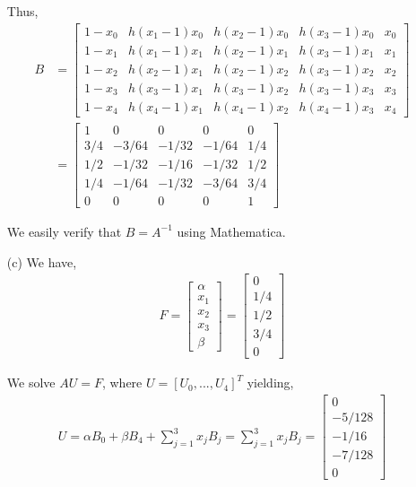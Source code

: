 \documentclass[10pt]{article}
\begin{document}
\begin{solution}[Solution]
\begin{enumerate}
        Thus,
        \begin{align*}
            B &= 
            \left[\begin{array}{rrrrr}
                1-x_0 & h(x_1-1)x_0 & h(x_2-1)x_0 & h(x_3-1)x_0 & x_0 \\
                1-x_1 & h(x_1-1)x_1 & h(x_2-1)x_1 & h(x_3-1)x_1 & x_1 \\
                1-x_2 & h(x_2-1)x_1 & h(x_2-1)x_2 & h(x_3-1)x_2 & x_2 \\
                1-x_3 & h(x_3-1)x_1 & h(x_3-1)x_2 & h(x_3-1)x_3 & x_3 \\
                1-x_4 & h(x_4-1)x_1 & h(x_4-1)x_2 & h(x_4-1)x_3 & x_4
            \end{array}\right]
            \\ &= 
            \left[\begin{array}{rrrrr}
                1   & 0 & 0 & 0 & 0 \\
                3/4 & -3/64 & -1/32 & -1/64 & 1/4 \\
                1/2 & -1/32 & -1/16 & -1/32 & 1/2 \\
                1/4 & -1/64 & -1/32 & -3/64 & 3/4 \\
                0   & 0 & 0 & 0 & 1
            \end{array}\right]
        \end{align*}

        We easily verify that \( B=A^{-1} \) using Mathematica.

    \item[(c)]
        We have,
        \begin{align*}
            F = \left[\begin{array}{r}
                \alpha \\ x_1 \\ x_2 \\ x_3 \\ \beta
            \end{array}\right]
            = \left[\begin{array}{r}
                0 \\ 1/4 \\ 1/2 \\ 3/4 \\ 0 
            \end{array}\right]
        \end{align*}

        We solve \( AU = F \), where \( U = [U_0, ..., U_{4}]^T \) yielding,
        \begin{align*}
            U = \alpha B_0 + \beta B_4 + \sum_{j=1}^{3}x_jB_j = \sum_{j=1}^{3}x_jB_j
           = \left[\begin{array}{r}
                0 \\ -5/128 \\ -1/16 \\ -7/128 \\ 0
            \end{array}\right]
        \end{align*}


\end{enumerate}
\end{solution}
\end{document}
